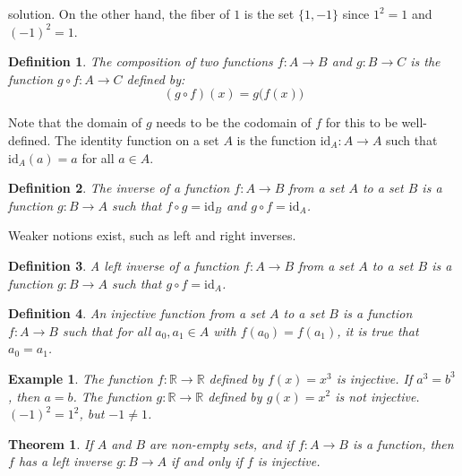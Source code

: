 \documentclass{article}
\theoremstyle{plain}
\newtheorem{theorem}{Theorem}[section]
\theoremstyle{normal}
\newtheorem{definition}{Definition}[section]
\newtheorem{example}{Example}[section]
\begin{document}
        solution. On the other hand, the fiber of $1$ is the set $\{1,-1\}$
        since $1^{2}=1$ and $(-1)^{2}=1$.
        \begin{definition}
            The composition of two functions $f:A\rightarrow{B}$ and
            $g:B\rightarrow{C}$ is the function $g\circ{f}:A\rightarrow{C}$
            defined by:
            \begin{equation}
                (g\circ{f})(x)=g\big(f(x)\big)
            \end{equation}
        \end{definition}
        Note that the domain of $g$ needs to be the codomain of $f$ for this
        to be well-defined. The identity function on a set $A$ is the function
        $\textrm{id}_{A}:A\rightarrow{A}$ such that $\textrm{id}_{A}(a)=a$ for
        all $a\in{A}$.
        \begin{definition}
            The inverse of a function $f:A\rightarrow{B}$ from a set $A$ to
            a set $B$ is a function $g:B\rightarrow{A}$ such that
            $f\circ{g}=\textrm{id}_{B}$ and
            $g\circ{f}=\textrm{id}_{A}$.
        \end{definition}
        Weaker notions exist, such as left and right inverses.
        \begin{definition}
            A left inverse of a function $f:A\rightarrow{B}$ from a set $A$ to
            a set $B$ is a function $g:B\rightarrow{A}$ such that
            $g\circ{f}=\textrm{id}_{A}$.
        \end{definition}
        \begin{definition}
            An injective function from a set $A$ to a set $B$ is a function
            $f:A\rightarrow{B}$ such that for all $a_{0},a_{1}\in{A}$ with
            $f(a_{0})=f(a_{1})$, it is true that $a_{0}=a_{1}$.
        \end{definition}
        \begin{example}
            The function $f:\mathbb{R}\rightarrow\mathbb{R}$ defined by
            $f(x)=x^{3}$ is injective. If $a^{3}=b^{3}$, then $a=b$. The
            function $g:\mathbb{R}\rightarrow\mathbb{R}$ defined by
            $g(x)=x^{2}$ is not injective. $(-1)^{2}=1^{2}$, but
            $-1\ne{1}$.
        \end{example}
        \begin{theorem}
            If $A$ and $B$ are non-empty sets, and if $f:A\rightarrow{B}$ is a
            function, then $f$ has a left inverse $g:B\rightarrow{A}$ if and
            only if $f$ is injective.
        \end{theorem}
\end{document}
